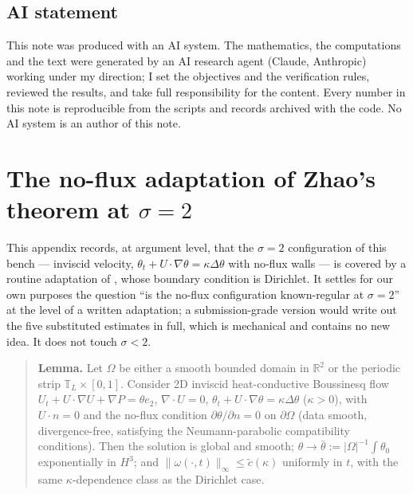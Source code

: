 \documentclass[11pt,a4paper]{article}
\newcommand{\R}{\mathbb{R}}
\newcommand{\nrm}[1]{\lVert #1 \rVert}
\newcommand{\abs}[1]{\lvert #1 \rvert}
\begin{document}
\subsection*{AI statement}
This note was produced with an AI system. The mathematics, the computations and the text were generated by an AI research agent (Claude, Anthropic) working under my direction; I set the objectives and the verification rules, reviewed the results, and take full responsibility for the content. Every number in this note is reproducible from the scripts and records archived with the code. No AI system is an author of this note.


\appendix
\section{The no-flux adaptation of Zhao's theorem at \texorpdfstring{$\sigma=2$}{sigma = 2}}\label{app:neumann}

This appendix records, at argument level, that the $\sigma=2$ configuration of this bench --- inviscid velocity, $\theta_t+U\cdot\nabla\theta=\kappa\Delta\theta$ with no-flux walls --- is covered by a routine adaptation of \cite[Theorem~1.1]{Zhao10}, whose boundary condition is Dirichlet. It settles for our own purposes the question ``is the no-flux configuration known-regular at $\sigma=2$'' at the level of a written adaptation; a submission-grade version would write out the five substituted estimates in full, which is mechanical and contains no new idea. It does not touch $\sigma<2$.

\begin{quote}
\textbf{Lemma.} Let $\Omega$ be either a smooth bounded domain in $\R^2$ or the periodic strip $\mathbb T_L\times[0,1]$. Consider 2D inviscid heat-conductive Boussinesq flow $U_t+U\cdot\nabla U+\nabla P=\theta e_2$, $\nabla\cdot U=0$, $\theta_t+U\cdot\nabla\theta=\kappa\Delta\theta$ ($\kappa>0$), with $U\cdot n=0$ and the no-flux condition $\partial\theta/\partial n=0$ on $\partial\Omega$ (data smooth, divergence-free, satisfying the Neumann-parabolic compatibility conditions). Then the solution is global and smooth; $\theta\to\bar\theta:=\abs\Omega^{-1}\int\theta_0$ exponentially in $H^3$; and $\nrm{\omega(\cdot,t)}_\infty\le\tilde c(\kappa)$ uniformly in $t$, with the same $\kappa$-dependence class as the Dirichlet case.
\end{quote}
\end{document}
